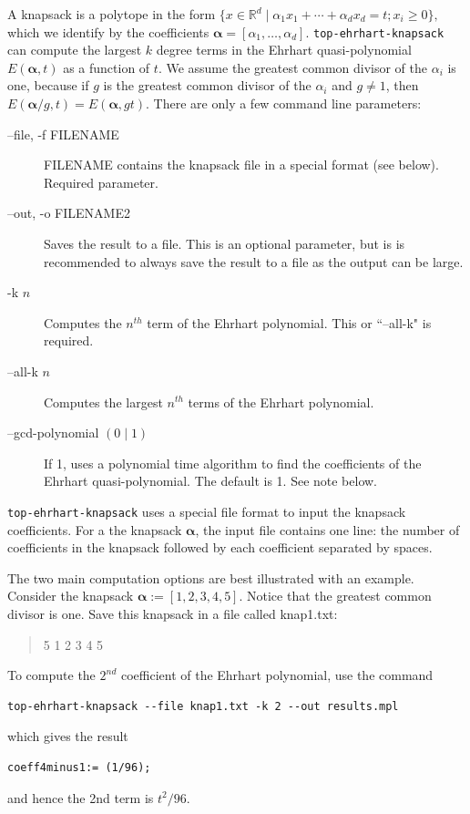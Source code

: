 \documentclass{article}
\newcommand{\R}{{\mathbb R}}
\begin{document}
A knapsack is a polytope in the form $\{x \in \R^d \mid \alpha_1 x_1 + \cdots + \alpha_d x_d = t; x_i \geq 0\},$ which we identify by the coefficients $\boldsymbol{\alpha}= [\alpha_1, \dots, \alpha_d].$   {\tt top-ehrhart-knapsack} can compute the largest $k$ degree terms in the Ehrhart quasi-polynomial $E(\boldsymbol{\alpha}, t)$ as a function of $t$.  We assume the greatest common divisor of the $\alpha_i$ is one, because if $g$ is the greatest common divisor of the $\alpha_i$ and $g\neq 1$, then $E(\boldsymbol{\alpha}/g, t) = E(\boldsymbol{\alpha}, gt) $. There are only a few command line parameters:

\begin{description}
\item[--file, -f FILENAME] FILENAME contains the knapsack file in a special format (see below). Required parameter.
\item[--out, -o FILENAME2] Saves the result to a file. This is an optional parameter, but is is recommended to always save the result to a file as the output can be large. 
\item[-k $n$] Computes the $n^{th}$ term of the Ehrhart polynomial. This or ``--all-k" is required.
\item[--all-k $n$] Computes the largest $n^{th}$ terms of the Ehrhart polynomial.  
\item[--gcd-polynomial $(0\mid 1)$] If 1, uses a polynomial time algorithm to find the coefficients of the Ehrhart quasi-polynomial. The default is 1. See note below.
\end{description}

{\tt top-ehrhart-knapsack} uses a special file format to input the knapsack coefficients. For a the knapsack $\boldsymbol{\alpha}$, the input file contains one line: the number of coefficients in the knapsack followed by each coefficient separated by spaces.

The two main computation options are best illustrated with an example. Consider the knapsack $\boldsymbol{\alpha}:=[1,2,3,4,5]$. Notice that the greatest common divisor  is one.  Save this knapsack in a file called knap1.txt:
\begin{verse}
5 1 2 3 4 5
\end{verse}

To compute the $2^{nd}$ coefficient of the Ehrhart polynomial,  use the command
\begin{verbatim}
top-ehrhart-knapsack --file knap1.txt -k 2 --out results.mpl
\end{verbatim}
which gives the result
\begin{verbatim}
coeff4minus1:= (1/96);
\end{verbatim}
and hence the 2nd term is $t^2/96$.
\end{document}
